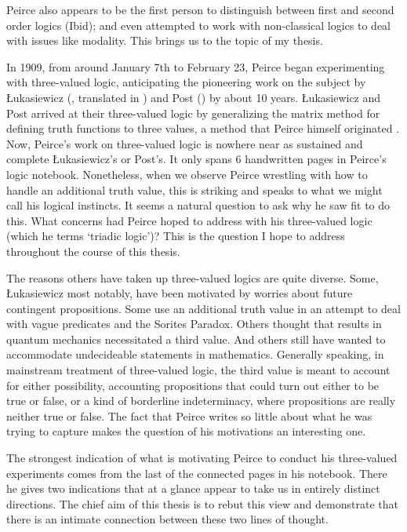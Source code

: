 Peirce also appears to be the first person to distinguish between first and second order logics (Ibid); and even attempted to work with non-classical logics to deal with issues like modality. This brings us to the topic of my thesis.

In 1909, from around January 7th to February 23, Peirce began experimenting with three-valued logic, anticipating the pioneering work on the subject by  Łukasiewicz (\citeyear{Lukasiewicz1920}, translated in \citeyear{Lukasiewicz1970a}) and Post (\citeyear{post_introduction_1921}) by about 10 years. Łukasiewicz and Post arrived at their three-valued logic by generalizing the matrix method for defining truth functions to three values, a method that Peirce himself originated \citep{anellis_peirces_2012}. Now, Peirce's work on three-valued logic is nowhere near as sustained and complete Łukasiewicz's or Post's. It only spans 6 handwritten pages in Peirce's logic notebook. Nonetheless, when we observe Peirce wrestling with how to handle an additional truth value, this is striking and speaks to what we might call his logical instincts. It seems a natural question to ask why he saw fit to do this. What concerns had Peirce hoped to address with his three-valued logic (which he terms `triadic logic')? This is the question I hope to address throughout the course of this thesis.

The reasons others have taken up three-valued logics are quite diverse. Some, Łukasiewicz most notably, have been motivated by worries about future contingent propositions.  Some use an additional truth value in an attempt to deal with vague predicates and the Sorites Paradox. Others thought that results in quantum mechanics necessitated a third value. And others still have wanted to accommodate undecideable statements in mathematics. Generally speaking, in mainstream treatment of three-valued logic, the third value is meant to account for either possibility, accounting propositions that could turn out either to be true or false, or a kind of borderline indeterminacy, where propositions are really neither true or false. The fact that Peirce writes so little about what he was trying to capture makes the question of his motivations an interesting one.

The strongest indication of what is motivating Peirce to conduct his three-valued experiments comes from the last of the connected pages in his notebook. There he gives two indications that at a glance appear to take us in entirely distinct directions. The chief aim of this thesis is to rebut this view and demonstrate that there is an intimate connection between these two lines of thought.

